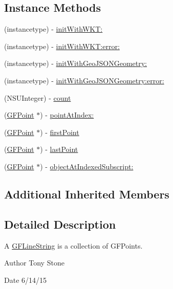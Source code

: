 \subsection*{Instance Methods}
\begin{DoxyCompactItemize}
\item 
(instancetype) -\/ \hyperlink{interface_g_f_line_string_a261a4d08fe5cb35f935d265c3a97f453}{init\+With\+W\+K\+T\+:}
\item 
(instancetype) -\/ \hyperlink{interface_g_f_line_string_acb421fc3195219e085f9bb69703ceb41}{init\+With\+W\+K\+T\+:error\+:}
\item 
(instancetype) -\/ \hyperlink{interface_g_f_line_string_ad7a913bc12b6099982229190d1debd71}{init\+With\+Geo\+J\+S\+O\+N\+Geometry\+:}
\item 
(instancetype) -\/ \hyperlink{interface_g_f_line_string_affe0307951a95edbf4b35092fc1b92ed}{init\+With\+Geo\+J\+S\+O\+N\+Geometry\+:error\+:}
\item 
(N\+S\+U\+Integer) -\/ \hyperlink{interface_g_f_line_string_a58fc2980cff73581d57943a64d60ddba}{count}
\item 
(\hyperlink{interface_g_f_point}{G\+F\+Point} $\ast$) -\/ \hyperlink{interface_g_f_line_string_a51963123a916fd666131859f571e2609}{point\+At\+Index\+:}
\item 
(\hyperlink{interface_g_f_point}{G\+F\+Point} $\ast$) -\/ \hyperlink{interface_g_f_line_string_a1fc7f9d3388d5237cb824573e8f6f71f}{first\+Point}
\item 
(\hyperlink{interface_g_f_point}{G\+F\+Point} $\ast$) -\/ \hyperlink{interface_g_f_line_string_aa9db281010dcfe2ab30b697710859dde}{last\+Point}
\item 
(\hyperlink{interface_g_f_point}{G\+F\+Point} $\ast$) -\/ \hyperlink{interface_g_f_line_string_a0711dbf3ae2b60f3f4d447578f544323}{object\+At\+Indexed\+Subscript\+:}
\end{DoxyCompactItemize}
\subsection*{Additional Inherited Members}


\subsection{Detailed Description}
A \hyperlink{interface_g_f_line_string}{G\+F\+Line\+String} is a collection of G\+F\+Points. 

\begin{DoxyAuthor}{Author}
Tony Stone 
\end{DoxyAuthor}
\begin{DoxyDate}{Date}
6/14/15 
\end{DoxyDate}



